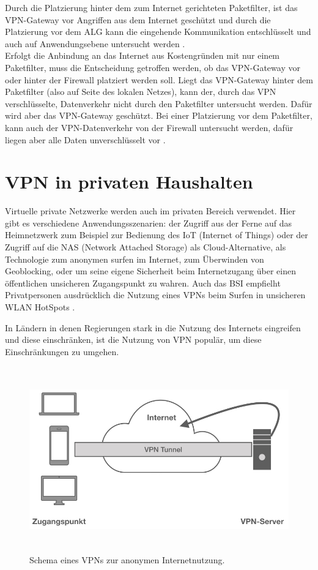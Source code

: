 Durch die Platzierung hinter dem zum Internet gerichteten Paketfilter, ist das VPN-Gateway vor Angriffen aus dem Internet geschützt und durch die Platzierung vor dem ALG kann die eingehende Kommunikation entschlüsselt und auch auf Anwendungsebene untersucht werden \cite{bsivpnaufbau}.\\
 
Erfolgt die Anbindung an das Internet aus Kostengründen mit nur einem Paketfilter, muss die Entscheidung getroffen werden, ob das VPN-Gateway vor oder hinter der Firewall platziert werden soll. Liegt das VPN-Gateway hinter dem Paketfilter (also auf Seite des lokalen Netzes), kann der, durch das VPN verschlüsselte, Datenverkehr nicht durch den Paketfilter untersucht werden. Dafür wird aber das VPN-Gateway geschützt. 
Bei einer Platzierung vor dem Paketfilter, kann auch der VPN-Datenverkehr von der Firewall untersucht werden, dafür liegen aber alle Daten unverschlüsselt vor \cite{eckert2018sicherheit}. 

\section{VPN in privaten Haushalten}

Virtuelle private Netzwerke werden auch im privaten Bereich  verwendet. Hier gibt es verschiedene Anwendungsszenarien: der Zugriff aus der Ferne auf das Heimnetzwerk zum Beispiel zur Bedienung des IoT (Internet of Things) oder der Zugriff auf die NAS (Network Attached Storage) als Cloud-Alternative, als Technologie zum anonymen surfen im Internet, zum Überwinden von Geoblocking, oder um seine eigene Sicherheit beim Internetzugang über einen öffentlichen unsicheren Zugangspunkt zu wahren. Auch das BSI empfielht  Privatpersonen ausdrücklich die Nutzung eines VPNs beim Surfen in unsicheren WLAN HotSpots \cite{bsibuergervpn}.

In Ländern in denen Regierungen stark in die Nutzung des Internets eingreifen und diese einschränken, ist die Nutzung von VPN populär, um diese Einschränkungen zu umgehen.\\


\begin{figure}[h]
	\includegraphics[width=\linewidth,height=8cm]{vpnPrivat.001.jpeg}
	\caption{Schema eines VPNs zur anonymen Internetnutzung.}
	\label{vpnPrivat}
\end{figure}

